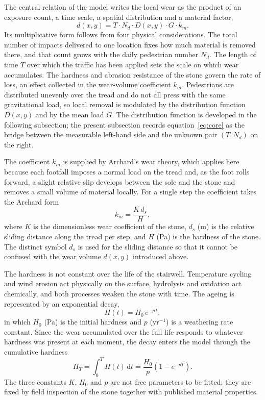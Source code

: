 The central relation of the model writes the local wear as the product of an exposure count, a time scale, a spatial distribution and a material factor,
\begin{equation}
d(x,y) = T \cdot N_d \cdot D(x,y) \cdot G \cdot k_m .
\label{eq:core}
\end{equation}
Its multiplicative form follows from four physical considerations. The total number of impacts delivered to one location fixes how much material is removed there, and that count grows with the daily pedestrian number $N_d$. The length of time $T$ over which the traffic has been applied sets the scale on which wear accumulates. The hardness and abrasion resistance of the stone govern the rate of loss, an effect collected in the wear-volume coefficient $k_m$. Pedestrians are distributed unevenly over the tread and do not all press with the same gravitational load, so local removal is modulated by the distribution function $D(x,y)$ and by the mean load $G$. The distribution function is developed in the following subsection; the present subsection records equation~\eqref{eq:core} as the bridge between the measurable left-hand side and the unknown pair $(T, N_d)$ on the right.

The coefficient $k_m$ is supplied by Archard's wear theory, which applies here because each footfall imposes a normal load on the tread and, as the foot rolls forward, a slight relative slip develops between the sole and the stone and removes a small volume of material locally. For a single step the coefficient takes the Archard form
\begin{equation}
k_m = \frac{K\, d_s}{H},
\label{eq:archard}
\end{equation}
where $K$ is the dimensionless wear coefficient of the stone, $d_s$ (m) is the relative sliding distance along the tread per step, and $H$ (Pa) is the hardness of the stone. The distinct symbol $d_s$ is used for the sliding distance so that it cannot be confused with the wear volume $d(x,y)$ introduced above.

The hardness is not constant over the life of the stairwell. Temperature cycling and wind erosion act physically on the surface, hydrolysis and oxidation act chemically, and both processes weaken the stone with time. The ageing is represented by an exponential decay,
\begin{equation}
H(t) = H_0\, e^{-p\,t},
\label{eq:hardness-decay}
\end{equation}
in which $H_0$ (Pa) is the initial hardness and $p$ (yr$^{-1}$) is a weathering rate constant. Since the wear accumulated over the full life responds to whatever hardness was present at each moment, the decay enters the model through the cumulative hardness
\begin{equation}
H_T = \int_0^{T} H(t)\,\mathrm{d}t = \frac{H_0}{p}\left(1 - e^{-p T}\right).
\label{eq:cumulative-hardness}
\end{equation}
The three constants $K$, $H_0$ and $p$ are not free parameters to be fitted; they are fixed by field inspection of the stone together with published material properties.

